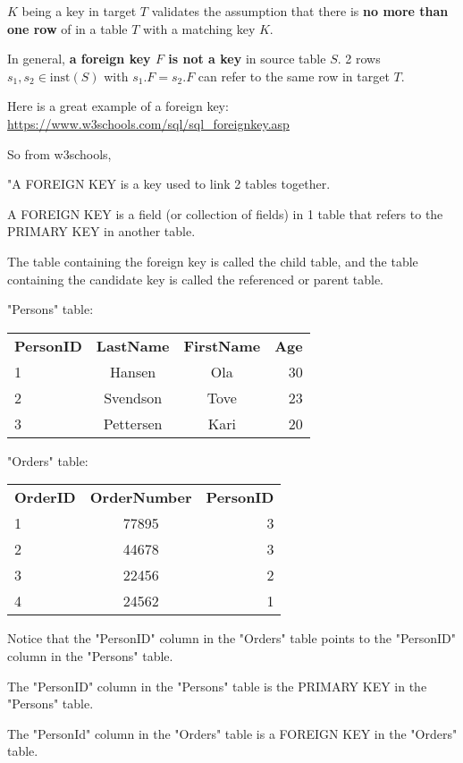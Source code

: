 \documentclass[10pt]{amsart}
\begin{document}
\begin{multicols*}{2}
$K$ being a key in target $T$ validates the assumption that there is \textbf{no more than one row} of in a table $T$ with a matching key $K$.

In general, \textbf{ a foreign key $F$ is not a key} in source table $S$. 2 rows $s_1, s_2 \in \text{inst}(S)$ with $s_1.F = s_2.F$ can refer to the same row in target $T$.

Here is a great example of a foreign key: \url{https://www.w3schools.com/sql/sql_foreignkey.asp}

So from w3schools, 

"A FOREIGN KEY is a key used to link 2 tables together.

A FOREIGN KEY is a field (or collection of fields) in 1 table that refers to the PRIMARY KEY in another table.

The table containing the foreign key is called the child table, and the table containing the candidate key is called the referenced or parent table.

"Persons" table:

\begin{tabular}{|l |c |c |r|}
\textbf{PersonID} & \textbf{LastName} & \textbf{FirstName} & \textbf{Age} \\
1 & Hansen & Ola & 30 \\
2 & Svendson & Tove & 23 \\
3 & Pettersen & Kari & 20 
\end{tabular}

"Orders" table:

\begin{tabular}{ | l | c | r | }
	\textbf{OrderID} & \textbf{OrderNumber} & \textbf{PersonID} \\ 
	1 & 77895 & 3 \\
	2 & 44678 & 3 \\
	3 & 22456 & 2 \\
	4 & 24562 & 1 
\end{tabular}

Notice that the "PersonID" column in the "Orders" table points to the "PersonID" column in the "Persons" table.

The "PersonID" column in the "Persons" table is the PRIMARY KEY in the "Persons" table.

The "PersonId" column in the "Orders" table is a FOREIGN KEY in the "Orders" table.


\end{multicols*}
\end{document}
